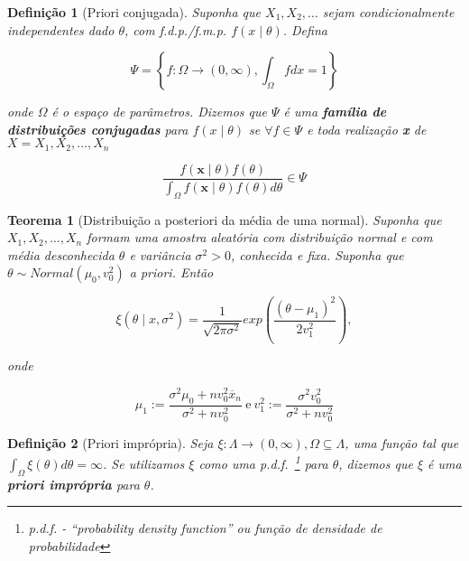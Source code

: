 \documentclass{article}
\newtheorem{theorem}{Teorema}
\newtheorem{definition}{Definição}
\begin{document}
\begin{definition}[Priori conjugada]
Suponha que $X_1, X_2, \ldots$ sejam condicionalmente independentes dado $\theta$, com f.d.p./f.m.p. $f(x\mid\theta)$. Defina

\begin{equation}
\Psi = \left \{ f: \Omega \rightarrow (0, \infty), \int_\Omega f dx = 1 \right \}
\end{equation}

onde $\Omega$ é o espaço de parâmetros. Dizemos que $\Psi$ é uma \textbf{família de distribuições conjugadas} para $f(x \mid \theta)$ se $\forall f \in \Psi$ e toda realização \textbf{x} de $X = X_1, X_2, \ldots, X_n$

\begin{equation}
\frac{f(\textbf{x} \mid \theta) f(\theta)}{\int_\Omega f(\textbf{x} \mid \theta)f(\theta) d \theta} \in \Psi
\end{equation}
\end{definition}

\begin{theorem}[Distribuição a posteriori da média de uma normal]
Suponha que $X_1, X_2, \ldots, X_n$ formam uma amostra aleatória com distribuição normal e com média desconhecida $\theta$ e variância $\sigma^2 > 0$, conhecida e fixa. Suponha que $\theta \sim Normal(\mu_0, v_0^2)$ a priori. Então

\begin{equation}
\xi (\theta \mid x, \sigma^2) = \frac{1}{\sqrt{2 \pi \sigma^2}} exp \left (\frac{(\theta - \mu_1)^2}{2v_1^2}\right ),
\end{equation}

onde

\begin{equation}
\mu_1 := \frac{\sigma^2 \mu_0 + n v_0^2 \overline{x}_n}{\sigma^2 + n v_ 0^2} \ \mathrm{e} \ v_1^2 := \frac{\sigma^2 v_0^2}{\sigma^2 + n v_0^2}
\end{equation}
\end{theorem}

\begin{definition}[Priori imprópria]
Seja $\xi : \Lambda \rightarrow (0, \infty), \Omega \subseteq \Lambda$, uma função tal que $\int_\Omega \xi(\theta) d \theta = \infty$. Se utilizamos $\xi$ como uma p.d.f.~\footnote{p.d.f. - ``probability density function'' ou função de densidade de probabilidade} para $\theta$, dizemos que $\xi$ é uma \textbf{priori imprópria} para $\theta$.
\end{definition}
\end{document}
